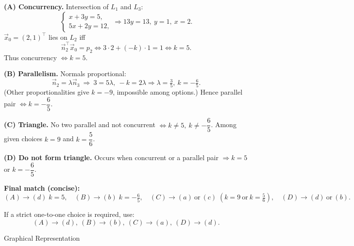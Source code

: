 \documentclass[journal]{IEEEtran}
\begin{document}
\textbf{(A) Concurrency.}
Intersection of $L_1$ and $L_3$:
\[
\begin{cases}
x+3y=5,\\[2pt]
5x+2y=12,
\end{cases}
\Rightarrow 13y=13,\ y=1,\ x=2.
\]
$\vec{x}_0=(2,1)^\top$ lies on $L_2$ iff
\[
\vec{n}_2^\top\vec{x}_0=p_2\iff 3\cdot2+(-k)\cdot1=1\iff k=5.
\]
Thus concurrency $\iff k=5$.

\medskip

\textbf{(B) Parallelism.}
Normals proportional:
\[
\vec{n}_2=\lambda\vec{n}_3\ \Rightarrow\ 3=5\lambda,\ -k=2\lambda
\Rightarrow \lambda=\tfrac{3}{5},\ k=-\tfrac{6}{5}.
\]
(Other proportionalities give $k=-9$, impossible among options.) Hence parallel pair $\iff k=-\dfrac{6}{5}$.

\medskip

\textbf{(C) Triangle.}
No two parallel and not concurrent $\iff k\neq5,\ k\neq-\dfrac{6}{5}$.  
Among given choices $k=9$ and $k=\dfrac{5}{6}$.

\medskip

\textbf{(D) Do not form triangle.}
Occurs when concurrent or a parallel pair $\Rightarrow k=5$ or $k=-\dfrac{6}{5}$.

\bigskip

\textbf{Final match (concise):}
\[
\boxed{(A)\to (d)\;k=5,\quad (B)\to (b)\;k=-\tfrac{6}{5},\quad (C)\to (a)\ \text{or}\ (c)\; (k=9\ \text{or}\ k=\tfrac{5}{6}),\quad (D)\to (d)\ \text{or}\ (b).}
\]

If a strict one-to-one choice is required, use:
\[
(A)\to(d),\ (B)\to(b),\ (C)\to(a),\ (D)\to(d).
\]
\begin{frame}{Graphical Representation}
\begin{center}
\end{center}
\end{frame}
\end{document}
